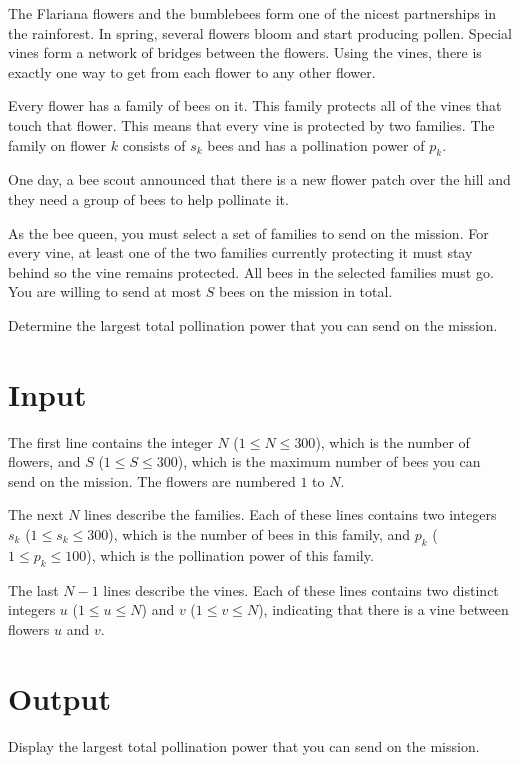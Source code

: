 
The Flariana flowers and the bumblebees form one of the nicest partnerships in the rainforest. In spring, several flowers bloom and start producing pollen. Special vines form a network of bridges between the flowers. Using the vines, there is exactly one way to get from each flower to any other flower.

Every flower has a family of bees on it. This family protects all of the vines that touch that flower. This means that every vine is protected by two families. The family on flower $k$ consists of $s_k$ bees and has a pollination power of $p_k$.

One day, a bee scout announced that there is a new flower patch over the hill and they need a group of bees to help pollinate it.

As the bee queen, you must select a set of families to send on the mission. For every vine, at least one of the two families currently protecting it must stay behind so the vine remains protected. All bees in the selected families must go. You are willing to send at most $S$ bees on the mission in total.

Determine the largest total pollination power that you can send on the mission.

\section*{Input}

The first line contains the integer $N$ ($1 \leq N \leq 300$), which is the number of flowers, and $S$ ($1 \leq S \leq 300$), which is the maximum number of bees you can send on the mission. The flowers are numbered $1$ to $N$.

The next $N$ lines describe the families. Each of these lines contains two integers $s_k$ ($1 \leq s_k \leq 300$), which is the number of bees in this family, and $p_k$ ($1 \leq p_k \leq 100$), which is the pollination power of this family.

The last $N-1$ lines describe the vines.  Each of these lines contains two distinct integers $u$ ($1 \leq u \leq N$) and $v$ ($1 \leq v \leq N$), indicating that there is a vine between flowers $u$ and $v$.

\section*{Output}

Display the largest total pollination power that you can send on the mission.
